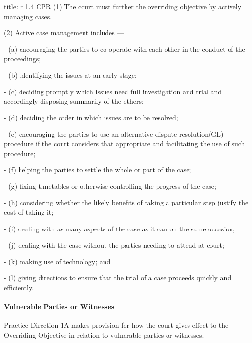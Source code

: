 \documentclass[
]{article}
\newenvironment{Shaded}{}{}
\newcommand{\NormalTok}[1]{#1}
\begin{document}
\begin{Shaded}
\begin{Highlighting}[]
\NormalTok{title: r 1.4 CPR}
\NormalTok{(1) The court must further the overriding objective by actively managing cases.}

\NormalTok{(2) Active case management includes —}

\NormalTok{{-} (a) encouraging the parties to co{-}operate with each other in the conduct of the proceedings;}

\NormalTok{{-} (b) identifying the issues at an early stage;}

\NormalTok{{-} (c) deciding promptly which issues need full investigation and trial and accordingly disposing summarily of the others;}

\NormalTok{{-} (d) deciding the order in which issues are to be resolved;}

\NormalTok{{-} (e) encouraging the parties to use an alternative dispute resolution(GL) procedure if the court considers that appropriate and facilitating the use of such procedure;}

\NormalTok{{-} (f) helping the parties to settle the whole or part of the case;}

\NormalTok{{-} (g) fixing timetables or otherwise controlling the progress of the case;}

\NormalTok{{-} (h) considering whether the likely benefits of taking a particular step justify the cost of taking it;}

\NormalTok{{-} (i) dealing with as many aspects of the case as it can on the same occasion;}

\NormalTok{{-} (j) dealing with the case without the parties needing to attend at court;}

\NormalTok{{-} (k) making use of technology; and}

\NormalTok{{-} (l) giving directions to ensure that the trial of a case proceeds quickly and efficiently.}
\end{Highlighting}
\end{Shaded}

\hypertarget{vulnerable-parties-or-witnesses}{%
\paragraph{Vulnerable Parties or
Witnesses}\label{vulnerable-parties-or-witnesses}}

Practice Direction 1A makes provision for how the court gives effect to
the Overriding Objective in relation to vulnerable parties or witnesses.
\end{document}
